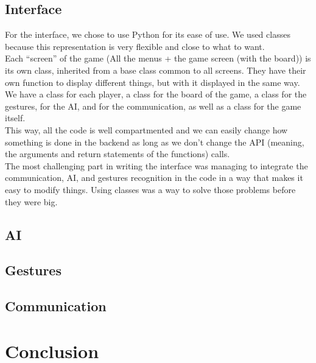 \documentclass[12pt, a4paper, oneside]{report}
\begin{document}
	\section{Interface}
	For the interface, we chose to use Python for its ease of use. We used classes because this representation is very flexible and close to what to want. \\

	Each “screen” of the game (All the menus + the game screen (with the board)) is its own class, inherited from a base class common to all screens. They have their own function to display different things, but with it displayed in the same way. \\ %

	We have a class for each player, a class for the board of the game, a class for the gestures, for the AI, and for the communication, as well as a class for the game itself. \\
	This way, all the code is well compartmented and we can easily change how something is done in the backend as long as we don't change the API (meaning, the arguments and return statements of the functions) calls. \\

	The most challenging part in writing the interface was managing to integrate the communication, AI, and gestures recognition in the code in a way that makes it easy to modify things. Using classes was a way to solve those problems before they were big.

	\section{AI}\label{AI_section}

	\section{Gestures}

	\section{Communication}

	\chapter{Conclusion}
\end{document}
